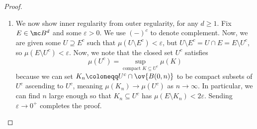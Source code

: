 \documentclass[../notes.tex]{subfiles}
\begin{document}
\begin{proof}
\begin{enumerate}
		\item We now show inner regularity from outer regularity, for any $d\ge1$. Fix $E\in\mc B^d$ and some $\varepsilon>0$. We use $(-)^c$ to denote complement. Now, we are given some $U\supseteq E^c$ such that $\mu(U\setminus E^c)<\varepsilon$, but $U\setminus E^c=U\cap E=E\setminus U^c$, so $\mu(E\setminus U^c)<\varepsilon$. Now, we note that the closed set $U^c$ satisfies
		\[\mu(U^c)=\sup_{\text{compact }K\subseteq U^c}\mu(K)\]
		because we can set $K_n\coloneqq U^c\cap\ov{B(0,n)}$ to be compact subsets of $U^c$ ascending to $U^c$, meaning $\mu(K_n)\to\mu(U^c)$ as $n\to\infty$. In particular, we can find $n$ large enough so that $K_n\subseteq U^c$ has $\mu(E\setminus K_n)<2\varepsilon$. Sending $\varepsilon\to0^+$ completes the proof.
		\qedhere
	\end{enumerate}
\end{proof}
\end{document}
